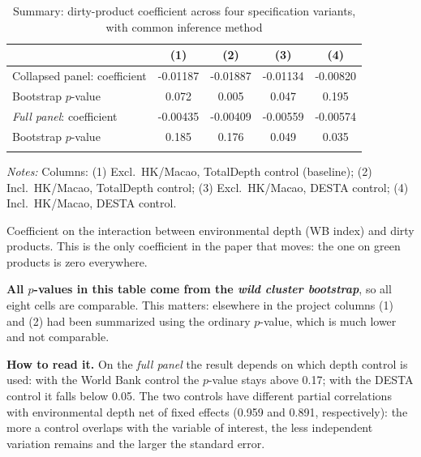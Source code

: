 \begin{table}[htbp]
\centering
\footnotesize
\caption{Summary: dirty-product coefficient across four specification variants, with common inference method}
\label{tab:matrice}
\begin{threeparttable}
\begin{tabular}{lcccc}
\toprule
 & (1) & (2) & (3) & (4) \\
\midrule
Collapsed panel: coefficient & -0.01187 & -0.01887 & -0.01134 & -0.00820 \\
\quad Bootstrap $p$-value & 0.072 & 0.005 & 0.047 & 0.195 \\
\addlinespace
\emph{Full panel}: coefficient & -0.00435 & -0.00409 & -0.00559 & -0.00574 \\
\quad Bootstrap $p$-value & 0.185 & 0.176 & 0.049 & 0.035 \\
\addlinespace
\bottomrule
\end{tabular}
\begin{tablenotes}[flushleft]\footnotesize
\item \emph{Notes:} Columns: (1) Excl.\ HK/Macao, TotalDepth control (baseline); (2) Incl.\ HK/Macao, TotalDepth control; (3) Excl.\ HK/Macao, DESTA control; (4) Incl.\ HK/Macao, DESTA control.
\item Coefficient on the interaction between environmental depth (WB index) and dirty products. This is the only coefficient in the paper that moves: the one on green products is zero everywhere.
\item \textbf{All $p$-values in this table come from the \emph{wild cluster bootstrap}}, so all eight cells are comparable. This matters: elsewhere in the project columns (1) and (2) had been summarized using the ordinary $p$-value, which is much lower and not comparable.
\item \textbf{How to read it.} On the \emph{full panel} the result depends on which depth control is used: with the World Bank control the $p$-value stays above 0.17; with the DESTA control it falls below 0.05. The two controls have different partial correlations with environmental depth net of fixed effects (0.959 and 0.891, respectively): the more a control overlaps with the variable of interest, the less independent variation remains and the larger the standard error.
\end{tablenotes}
\end{threeparttable}
\end{table}
